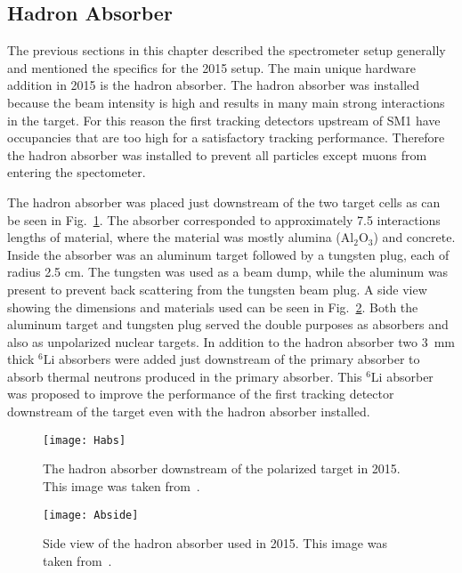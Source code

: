 \subsection{Hadron Absorber}
The previous sections in this chapter described the spectrometer setup generally
and mentioned the specifics for the 2015 setup.  The main unique hardware
addition in 2015 is the hadron absorber.  The hadron absorber was installed
because the beam intensity is high and results in many main strong interactions
in the target.  For this reason the first tracking detectors upstream of SM1
have occupancies that are too high for a satisfactory tracking performance.
Therefore the hadron absorber was installed to prevent all particles except
muons from entering the spectometer. \par

The hadron absorber was placed just downstream of the two target cells as can be
seen in Fig.~\ref{fig::Habs}.  The absorber corresponded to approximately 7.5
interactions lengths of material, where the material was mostly alumina
(Al$_2$O$_3$) and concrete.  Inside the absorber was an aluminum target followed
by a tungsten plug, each of radius 2.5 cm.  The tungsten was used as a beam
dump, while the aluminum was present to prevent back scattering from the
tungsten beam plug.  A side view showing the dimensions and materials used can
be seen in Fig.~\ref{fig::Abside}.  Both the aluminum target and tungsten plug
served the double purposes as absorbers and also as unpolarized nuclear targets.
In addition to the hadron absorber two 3~mm thick $^6\mathrm{Li}$ absorbers were
added just downstream of the primary absorber to absorb thermal neutrons
produced in the primary absorber.  This $^6\mathrm{Li}$ absorber was proposed to
improve the performance of the first tracking detector downstream of the target
even with the hadron absorber installed. \par

\begin{figure}[h!t]
  \centering
  \texttt{[image: Habs]}
  \caption{The hadron absorber downstream of the polarized target in 2015.  This
    image was taken from~\cite{longothesis}.}
  \label{fig::Habs}
\end{figure}

\begin{figure}[h!t]
  \centering
  \texttt{[image: Abside]}
  \caption{Side view of the hadron absorber used in 2015.  This image was taken
    from~\cite{longothesis}.}
  \label{fig::Abside}
\end{figure}
